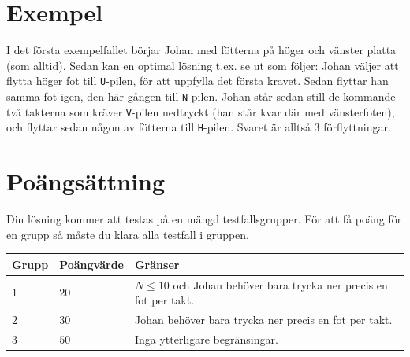 \section*{Exempel}
I det första exempelfallet börjar Johan med fötterna på höger och vänster platta (som alltid).
Sedan kan en optimal lösning t.ex. se ut som följer: Johan väljer att flytta höger fot till \texttt{U}-pilen, för att uppfylla det första kravet.
Sedan flyttar han samma fot igen, den här gången till \texttt{N}-pilen.
Johan står sedan still de kommande två takterna som kräver \texttt{V}-pilen nedtryckt (han står kvar där med vänsterfoten), och flyttar sedan någon av fötterna till \texttt{H}-pilen.
Svaret är alltså $3$ förflyttningar.

\section*{Poängsättning}
Din lösning kommer att testas på en mängd testfallsgrupper.
För att få poäng för en grupp så måste du klara alla testfall i gruppen.

\noindent
\begin{tabular}{| l | l | p{12cm} |}
  \hline
  Grupp & Poängvärde & Gränser \\ \hline
  $1$    & $20$        & $N \le 10$ och Johan behöver bara trycka ner precis en fot per takt. \\ \hline 
  $2$    & $30$        & Johan behöver bara trycka ner precis en fot per takt. \\ \hline
  $3$    & $50$        & Inga ytterligare begränsingar. \\ \hline 
\end{tabular}
